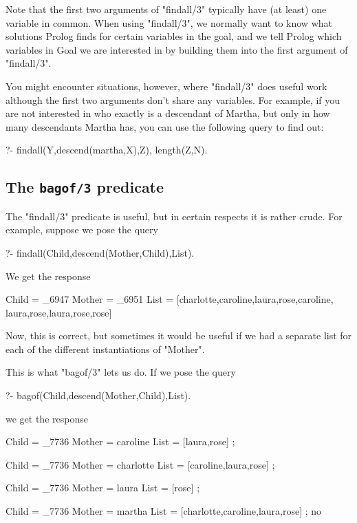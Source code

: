 Note that the first two arguments of "findall/3" typically have (at
least) one variable in common. When using "findall/3", we normally
want to know what solutions Prolog finds for certain variables in the
goal, and we tell Prolog which variables in Goal we are interested in
by building them into the first argument of "findall/3".

You might encounter situations, however, where "findall/3" does
useful work although the first two arguments don't share any
variables. For example, if you are not interested in who exactly is a
descendant of Martha, but only in how many descendants Martha has, you
can use the following query to find out:
\begin{LPNcodedisplay}
?- findall(Y,descend(martha,X),Z), length(Z,N).
\end{LPNcodedisplay}




\subsection*{The {\tt bagof/3} predicate}\label{SUBSEC.L11.BAGOF}

The "findall/3" predicate is useful, but in certain respects
it is rather crude. For example, suppose we pose the query
\begin{LPNcodedisplay}
?- findall(Child,descend(Mother,Child),List).
\end{LPNcodedisplay}
We get the response
\begin{LPNcodedisplay}
Child = _6947
Mother = _6951
List = [charlotte,caroline,laura,rose,caroline,
        laura,rose,laura,rose,rose]
\end{LPNcodedisplay}
Now, this is correct, but sometimes it would be useful if we had a
separate list for each of the different instantiations of "Mother".

This is what "bagof/3" lets us do.  If we pose the query  
\begin{LPNcodedisplay}
?- bagof(Child,descend(Mother,Child),List).
\end{LPNcodedisplay}
we get the response
\begin{LPNcodedisplay}
Child = _7736
Mother = caroline
List = [laura,rose] ;

Child = _7736
Mother = charlotte
List = [caroline,laura,rose] ;

Child = _7736
Mother = laura
List = [rose] ;

Child = _7736
Mother = martha
List = [charlotte,caroline,laura,rose] ;
no
\end{LPNcodedisplay}

